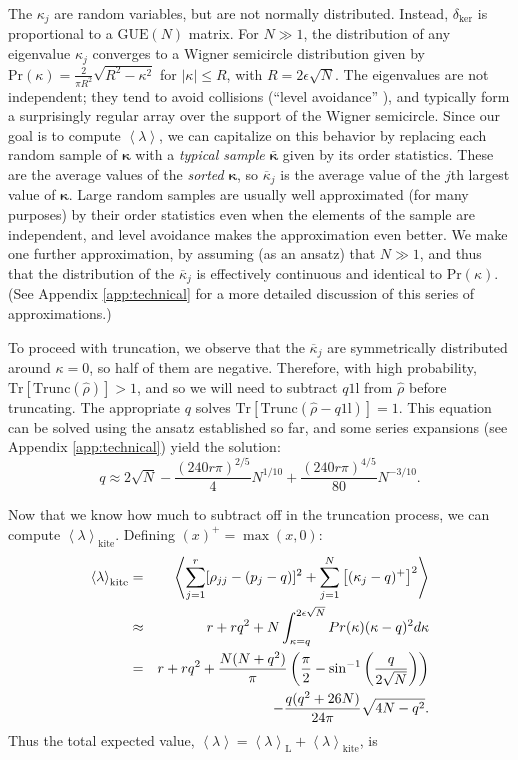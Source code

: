 \documentclass[aps,pra, twocolumn]{revtex4}
\newcommand{\Tr}{\mathrm{Tr}}
\newcommand{\expect}[1]{\ensuremath{\left\langle#1\right\rangle}}
\def\Id{1\!\mathrm{l}}
\newcommand{\bvec}[1]{\boldsymbol{#1}}
\begin{document}
The $\kappa_j$ are random variables, but are not normally distributed.  Instead, $\delta_{\mathrm{ker}}$ is proportional to a $\mathrm{GUE}(N)$ matrix. For $N\gg1$, the distribution of any eigenvalue $\kappa_{j}$
converges to a Wigner semicircle distribution \cite{Wigner1958} given by $\mathrm{Pr}(\kappa) = \frac{2}{\pi R^{2}}\sqrt{R^{2}-\kappa^{2}}$ for $|\kappa| \leq R$, with $R = 2\epsilon\sqrt{N}$.  The eigenvalues are not independent; they tend to avoid collisions (``level avoidance'' \cite{Tao2013}), 
and typically form a surprisingly regular array over the support of the Wigner semicircle.  Since our goal is to compute $\expect{\lambda}$, we can capitalize on this behavior by replacing each random sample of $\bvec{\kappa}$ with a 
\emph{typical sample} $\bar{\bvec{\kappa}}$ given by its order statistics.  These are the average values of the \emph{sorted} 
$\bvec{\kappa}$, so $\overline{\kappa}_j$ is the average value of the $j$th largest value of $\bvec{\kappa}$.  Large random samples 
are usually well approximated (for many purposes) by their order statistics even when the elements of the sample are 
independent, and level avoidance makes the approximation even better.  We make one further approximation, by assuming (as an ansatz) that $N\gg1$, and thus that the distribution of the $\overline{\kappa}_j$ is effectively continuous and identical to $\mathrm{Pr}(\kappa)$.  (See Appendix \ref{app:technical} for a more detailed discussion of this series of approximations.)

To proceed with truncation, we observe that the $\overline{\kappa}_j$ are symmetrically distributed around $
\kappa=0$, so half of them are negative.  Therefore, with high probability, $\Tr
\left[\mathrm{Trunc}(\hat\rho)\right]>1$, and so we will need to subtract $q\Id$ from $\hat\rho$ before truncating.  The appropriate $q$ solves $\Tr\left[\mathrm{Trunc}(\hat\rho-q\Id)\right] = 1$.  This equation can be solved using the ansatz established so far, and some series expansions (see Appendix \ref{app:technical}) yield the solution:
\begin{equation}
\label{eq:truncation}
q \approx 2\sqrt{N}-\frac{(240r\pi)^{2/5}}{4}N^{1/10}+\frac{(240r\pi)^{4/5}}{80}N^{-3/10}.
\end{equation}

Now that we know how much to subtract off in the truncation process, we can compute $\expect{\lambda}_{\mathrm{kite}}$.  Defining $(x)^{+} = \max(x, 0)$:
\begin{eqnarray}
\nonumber \expect{\lambda}_{\mathrm{kite}} &=& \left\langle\sum_{j=1}^{r}[\rho_{jj}- (p_j-q)]^2 + \sum_{j=1}^{N}\left[(\kappa_j-q)^+\right]^2 \right\rangle\\
\nonumber  &\approx& r + rq^2 + N\int_{\kappa=q}^{2\epsilon\sqrt{N}}{ Pr(\kappa)(\kappa-q)^2 d\kappa} \\
\nonumber &=& r + rq^2 + \frac{N(N+q^2)}{\pi} \left( \frac{\pi}{2} - \sin^{-1}\left(\frac{q}{2\sqrt{N}}\right)\right)  \nonumber \\
&&\hspace{0.3in}-\frac{q(q^2+26N)}{24\pi} \sqrt{4N-q^2}.
\end{eqnarray}
Thus the total expected value, $\expect{\lambda} = \expect{\lambda}_{\mathrm{L}} + \expect{\lambda}_{\mathrm{kite}}$, is 
\end{document}
